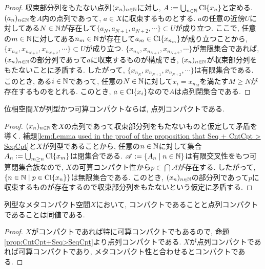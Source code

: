 \documentclass[uplatex, dvipdfmx, a4paper, 12pt, class=jsbook, crop=false]{standalone}
\begin{document}
\begin{proof}
	収束部分列をもたない点列$ (x_n)_{n \in \mathbb{N}} $に対し, $ A \mathrel{:=} \bigcup_{n \in \mathbb{N}} \mathop{\mathrm{Cl}}\nolimits \{x_n\} $と定める. $ (a_n)_{n \in \mathbb{N}} $を$ A $内の点列であって, $ a \in X $に収束するものとする. $ a $の任意の近傍$ U $に対してある$ N \in \mathbb{N} $が存在して$ \{a_N, a_{N+1}, a_{N+2}, \cdots \} \subset U $が成り立つ. ここで, 任意の$ m \in \mathbb{N} $に対してある$n_m \in \mathbb{N} $が存在して$ a_m \in \mathop{\mathrm{Cl}}\nolimits \{x_{n_m}\} $が成り立つことから, $ \{x_{n_{N}}, x_{n_{N+1}}, x_{n_{N+2}}, \cdots\} \subset U $が成り立つ. $ \{x_{n_{N}}, x_{n_{N+1}}, x_{n_{N+2}}, \cdots\} $が無限集合であれば, $ (x_n)_{n \in \mathbb{N}} $の部分列であって$ a $に収束するものが構成でき, $ (x_n)_{n \in \mathbb{N}} $が収束部分列をもたないことに矛盾する. したがって, $ \{x_{n_{N}}, x_{n_{N+1}}, x_{n_{N+2}}, \cdots\} $は有限集合である. このとき, ある$ i \in \mathbb{N} $であって, 任意の$ N \in \mathbb{N} $に対して$ x_i = x_{n_{M}} $を満たす$ M \geq N $が存在するものをとれる. このとき, $ a \in \mathop{\mathrm{Cl}}\nolimits \{x_i\} $なので$ A $は点列閉集合である.
\end{proof}


\begin{proposition}
	\label{prop:CntCpt+Seq>SeqCpt}
	位相空間$ X $が列型かつ可算コンパクトならば, 点列コンパクトである.
\end{proposition}

\begin{proof}
	$ (x_n)_{n \in \mathbb{N}} $を$ X $の点列であって収束部分列をもたないものと仮定して矛盾を導く. 補題\ref{lem:Lemma used in the proof of the proposition that Seq + CntCpt > SeqCpt}と$ X $が列型であることから, 任意の$ n \in \mathbb{N} $に対して集合$ A_n \mathrel{:=} \bigcup_{m \geq n} \mathop{\mathrm{Cl}}\nolimits\{x_m\} $は閉集合である. $\mathscr{A} \defeq \setcomp{A_n}{n \in \N} $は有限交叉性をもつ可算閉集合族なので, $ X $の可算コンパクト性から$ p \in \bigcap \mathscr{A} $が存在する. したがって, $ \setcomp{n \in \N}{p \in \topcl \{x_n\}} $は無限集合である. このとき, $ (x_n)_{n \in \mathbb{N}} $の部分列であって$ p $に収束するものが存在するので収束部分列をもたないという仮定に矛盾する.
\end{proof}

\begin{theorem}
	列型なメタコンパクト空間$ X $において, コンパクトであることと点列コンパクトであることは同値である.
\end{theorem}

\begin{proof}
	$ X $がコンパクトであれば特に可算コンパクトでもあるので, 命題\ref{prop:CntCpt+Seq>SeqCpt}より点列コンパクトである. $ X $が点列コンパクトであれば可算コンパクトであり, メタコンパクト性と合わせるとコンパクトである.
\end{proof}
\end{document}
